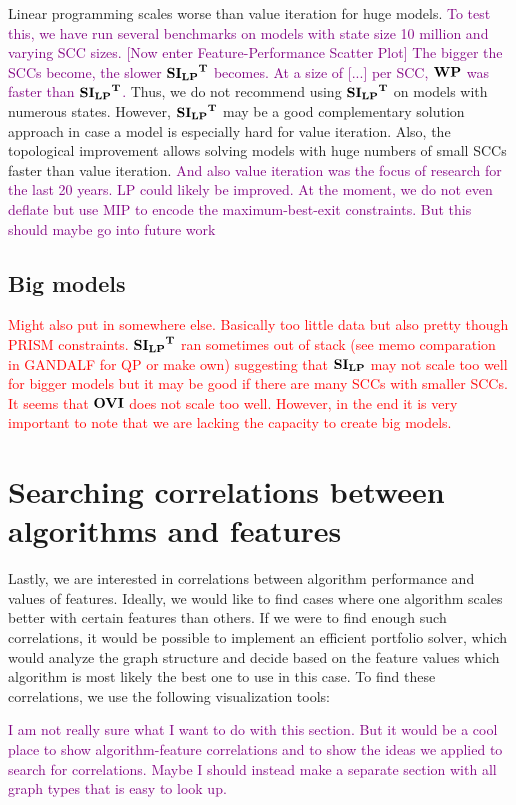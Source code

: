 Linear programming scales worse than value iteration for huge models. \textcolor{purple}{To test this, we have 
run several benchmarks on models with state size 10 million and varying SCC sizes. [Now enter Feature-Performance Scatter Plot] 
The bigger the SCCs become, the slower $\mathbf{\mathbf{SI_{LP}}^T}$ becomes. At a size of [...] per SCC, $\mathbf{WP}$ was faster than $\mathbf{\mathbf{SI_{LP}}^T}$.}
Thus, we do not recommend using $\mathbf{\mathbf{SI_{LP}}^T}$ on models with numerous states.
However, $\mathbf{\mathbf{SI_{LP}}^T}$ may be a good complementary solution approach in case a model is especially hard for value iteration.
Also, the topological improvement allows solving models with huge numbers of small SCCs faster than value iteration.
\textcolor{purple}{And also value iteration was the focus of research for the last 20 years. 
LP could likely be improved. At the moment, we do not even deflate but use MIP to encode the maximum-best-exit constraints. But this should maybe go into future work}

\subsection{Big models}
\textcolor{red}{Might also put in somewhere else. Basically too little data but also pretty though PRISM constraints.
$\mathbf{\mathbf{SI_{LP}}^T}$ ran sometimes out of stack (see memo comparation in GANDALF for QP or make own) suggesting that $\mathbf{SI_{LP}}$ may not scale too well 
for bigger models but it may be good if there are many SCCs with smaller SCCs.
It seems that $\mathbf{OVI}$ does not scale too well. However, in the end it is very important to note that we are lacking the capacity to create
big models.}

\section{Searching correlations between algorithms and features}
Lastly, we are interested in correlations between algorithm performance and values of features.
Ideally, we would like to find cases where one algorithm scales better with certain features than others.
If we were to find enough such correlations, it would be possible to implement an efficient portfolio solver, which
would analyze the graph structure and decide based on the feature values which algorithm is most likely the best one to use in this case.
To find these correlations, we use the following visualization tools:

\textcolor{purple}{I am not really sure what I want to do with this section. 
But it would be a cool place to show algorithm-feature correlations and to show the ideas we applied to search for correlations.
Maybe I should instead make a separate section with all graph types that is easy to look up.}


